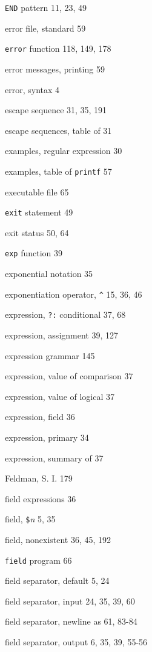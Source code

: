 \begin{multicols}{3}
\verb'END' pattern 11, 23, 49

error file, standard 59

\verb'error' function 118, 149, 178

error messages, printing 59

error, syntax 4

escape sequence 31, 35, 191

escape sequences, table of 31

examples, regular expression 30

examples, table of \verb'printf' 57

executable file 65

\verb'exit' statement 49

exit status 50, 64

\verb'exp' function 39

exponential notation 35

exponentiation operator, \verb'^' 15, 36, 46

expression, \verb'?:' conditional 37, 68

expression, assignment 39, 127

expression grammar 145

expression, value of comparison 37

expression, value of logical 37

expression, field 36

expression, primary 34

expression, summary of 37

Feldman, S. I. 179

field expressions 36

field, \verb'$'\textit{n} 5, 35

field, nonexistent 36, 45, 192

\verb'field' program 66

field separator, default 5, 24

field separator, input 24, 35, 39, 60

field separator, newline as 61, 83-84

field separator, output 6, 35, 39, 55-56
\end{multicols}
